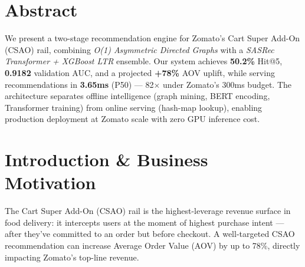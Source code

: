 \documentclass[10pt, twocolumn, a4paper]{article}
\begin{document}

\section*{Abstract}

We present a two-stage recommendation engine for Zomato's Cart Super Add-On (CSAO) rail, combining \textit{O(1) Asymmetric Directed Graphs} with a \textit{SASRec Transformer + XGBoost LTR} ensemble. Our system achieves \textbf{50.2\%} Hit@5, \textbf{0.9182} validation AUC, and a projected \textbf{+78\%} AOV uplift, while serving recommendations in \textbf{3.65ms} (P50) --- 82$\times$ under Zomato's 300ms budget. The architecture separates offline intelligence (graph mining, BERT encoding, Transformer training) from online serving (hash-map lookup), enabling production deployment at Zomato scale with zero GPU inference cost.

\section{Introduction \& Business Motivation}

The Cart Super Add-On (CSAO) rail is the highest-leverage revenue surface in food delivery: it intercepts users at the moment of highest purchase intent --- after they've committed to an order but before checkout. A well-targeted CSAO recommendation can increase Average Order Value (AOV) by up to 78\%, directly impacting Zomato's top-line revenue.
\end{document}
